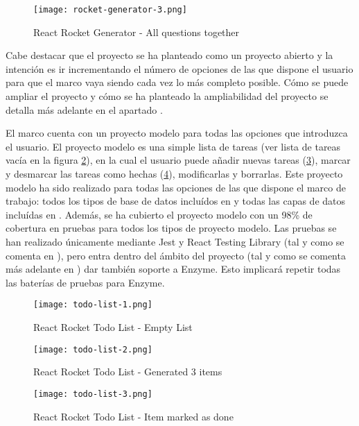 \begin{figure}
  \centering
  \texttt{[image: rocket-generator-3.png]}
  \caption{React Rocket Generator - All questions together}
  \label{fig:rocket-generator-3}
\end{figure}

Cabe destacar que el proyecto se ha planteado como un proyecto abierto y la intención es ir incrementando el número de opciones de las que dispone el usuario para que el marco vaya siendo cada vez lo más completo posible. Cómo se puede ampliar el proyecto y cómo se ha planteado la ampliabilidad del proyecto se detalla más adelante en el apartado .

El marco cuenta con un proyecto modelo para todas las opciones que introduzca el usuario. El proyecto modelo es una simple lista de tareas (ver lista de tareas vacía en la figura \cref{fig:todo-list-1}), en la cual el usuario puede añadir nuevas tareas (\cref{fig:todo-list-2}), marcar y desmarcar las tareas como hechas (\cref{fig:todo-list-3}), modificarlas y borrarlas. Este proyecto modelo ha sido realizado para todas las opciones de las que dispone el marco de trabajo: todos los tipos de base de datos incluídos en  y todas las capas de datos incluídas en . Además, se ha cubierto el proyecto modelo con un 98\% de cobertura en pruebas para todos los tipos de proyecto modelo. Las pruebas se han realizado únicamente mediante Jest y React Testing Library (tal y como se comenta en ), pero entra dentro del ámbito del proyecto (tal y como se comenta más adelante en ) dar también soporte a Enzyme. Esto implicará repetir todas las baterías de pruebas para Enzyme.

\begin{figure}
  \centering
  \texttt{[image: todo-list-1.png]}
  \caption{React Rocket Todo List - Empty List}
  \label{fig:todo-list-1}
\end{figure}

\begin{figure}
  \centering
  \texttt{[image: todo-list-2.png]}
  \caption{React Rocket Todo List - Generated 3 items}
  \label{fig:todo-list-2}
\end{figure}

\begin{figure}
  \centering
  \texttt{[image: todo-list-3.png]}
  \caption{React Rocket Todo List - Item marked as done}
  \label{fig:todo-list-3}
\end{figure}


